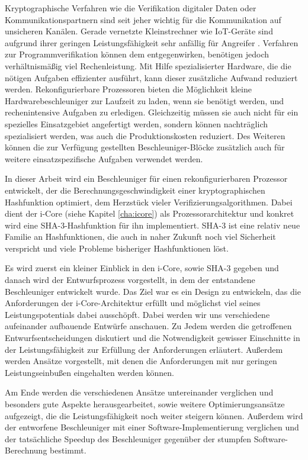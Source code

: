 Kryptographische Verfahren wie die Verifikation digitaler Daten oder Kommunikationspartnern sind seit jeher wichtig für die Kommunikation auf unsicheren Kanälen.
Gerade vernetzte Kleinstrechner wie IoT-Geräte sind aufgrund ihrer geringen Leistungsfähigkeit sehr anfällig für Angreifer \cite{iot-security}.
Verfahren zur Programmverifikation können dem entgegenwirken, benötigen jedoch verhältnismäßig viel Rechenleistung.
Mit Hilfe spezialisierter Hardware, die die nötigen Aufgaben effizienter ausführt, kann dieser zusätzliche Aufwand reduziert werden.
Rekonfigurierbare Prozessoren bieten die Möglichkeit kleine Hardwarebeschleuniger zur Laufzeit zu laden,
wenn sie benötigt werden, und rechenintensive Aufgaben zu erledigen. Gleichzeitig müssen sie auch nicht für ein spezielles
Einsatzgebiet angefertigt werden, sondern können nachträglich spezialisiert werden, was auch die Produktionskosten reduziert.
Des Weiteren können die zur Verfügung gestellten Beschleuniger-Blöcke zusätzlich auch für weitere einsatzspezifische Aufgaben verwendet werden.

In dieser Arbeit wird ein Beschleuniger für einen rekonfigurierbaren Prozessor entwickelt, der die Berechnungsgeschwindigkeit einer
kryptographischen Hashfunktion optimiert, dem Herzstück vieler Verifizierungsalgorithmen. Dabei dient der i-Core (siehe Kapitel \ref{cha:icore}) als Prozessorarchitektur
und konkret wird eine SHA-3-Hashfunktion für ihn implementiert. SHA-3 ist eine relativ neue Familie an Hashfunktionen,
die auch in naher Zukunft noch viel Sicherheit verspricht und viele Probleme bisheriger Hashfunktionen löst.

Es wird zuerst ein kleiner Einblick in den i-Core, sowie SHA-3 gegeben und
danach wird der Entwurfsprozess vorgestellt, in dem der entstandene Beschleuniger entwickelt wurde. Das Ziel war es ein Design zu entwickeln, das die Anforderungen
der i-Core-Architektur erfüllt und möglichst viel seines Leistungspotentials dabei ausschöpft. Dabei werden wir uns
verschiedene aufeinander aufbauende Entwürfe anschauen. Zu Jedem werden die getroffenen Entwurfsentscheidungen diskutiert und die
Notwendigkeit gewisser Einschnitte in der Leistungsfähigkeit zur Erfüllung der Anforderungen erläutert. Außerdem werden Ansätze
vorgestellt, mit denen die Anforderungen mit nur geringen Leistungseinbußen eingehalten werden können.

Am Ende werden die verschiedenen Ansätze untereinander verglichen und besonders gute Aspekte herausgearbeitet,
sowie weitere Optimierungsansätze aufgezeigt, die die Leistungsfähigkeit noch weiter steigern können. Außerdem wird der entworfene Beschleuniger
mit einer Software-Implementierung verglichen und der tatsächliche Speedup des Beschleuniger gegenüber der stumpfen Software-Berechnung bestimmt.
